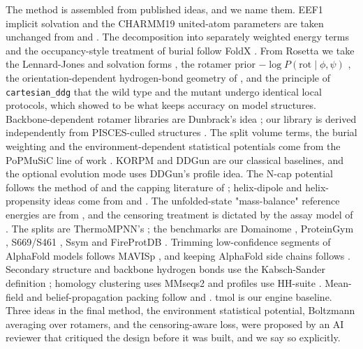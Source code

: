\documentclass[unnumsec,webpdf,contemporary,large]{oup-authoring-template}
\begin{document}
The method is assembled from published ideas, and we name them. EEF1 implicit solvation and the CHARMM19
united-atom parameters are taken unchanged from \citet{lazaridis1999} and \citet{brooks1983,neria1996}. The
decomposition into separately weighted energy terms and the occupancy-style treatment of burial follow FoldX
\citep{guerois2002,schymkowitz2005}. From Rosetta we take the Lennard-Jones and solvation forms
\citep{alford2017,park2016}, the rotamer prior $-\log P(\mathrm{rot}\mid\phi,\psi)$ \citep{dunbrack1993}, the
orientation-dependent hydrogen-bond geometry of \citet{kortemme2003}, and the principle of
\texttt{cartesian\_ddg} that the wild type and the mutant undergo identical local protocols, which
\citet{valanciute2023} showed to be what keeps accuracy on model structures. Backbone-dependent rotamer
libraries are Dunbrack's idea \citep{dunbrack1993,shapovalov2011}; our library is derived independently from
PISCES-culled structures \citep{wang2003}. The split volume terms, the burial weighting and the
environment-dependent statistical potentials come from the PoPMuSiC line of work
\citep{gilis1997,dehouck2009}. KORPM \citep{hernandez2023} and DDGun \citep{montanucci2019,montanucci2022} are
our classical baselines, and the optional evolution mode uses DDGun's profile idea. The N-cap potential follows
the method of \citet{richardson1988} and the capping literature of \citet{doig1995}; helix-dipole and
helix-propensity ideas come from \citet{hol1978,shoemaker1987} and \citet{pace1998}. The unfolded-state
"mass-balance" reference energies are from \citet{rossi2025}, and the censoring treatment is dictated by the
assay model of \citet{tsuboyama2023}. The splits are ThermoMPNN's \citep{dieckhaus2024}; the benchmarks are
Domainome \citep{beltran2025}, ProteinGym \citep{notin2023}, S669/S461
\citep{pancotti2022,hernandez2023}, Ssym \citep{pucci2018} and FireProtDB \citep{stourac2021}. Trimming
low-confidence segments of AlphaFold models follows MAVISp \citep{arnaudi2026}, and keeping AlphaFold side
chains follows \citet{vangaru2025}. Secondary structure and backbone hydrogen bonds use the Kabsch-Sander
definition \citep{kabsch1983}; homology clustering uses MMseqs2 \citep{steinegger2017} and profiles use HH-suite
\citep{steinegger2019}. Mean-field and belief-propagation packing follow \citet{koehl1994} and
\citet{kamisetty2008}. tmol \citep{tmol} is our engine baseline. Three ideas in the final method, the
environment statistical potential, Boltzmann averaging over rotamers, and the censoring-aware loss, were
proposed by an AI reviewer that critiqued the design before it was built, and we say so explicitly.
\end{document}
